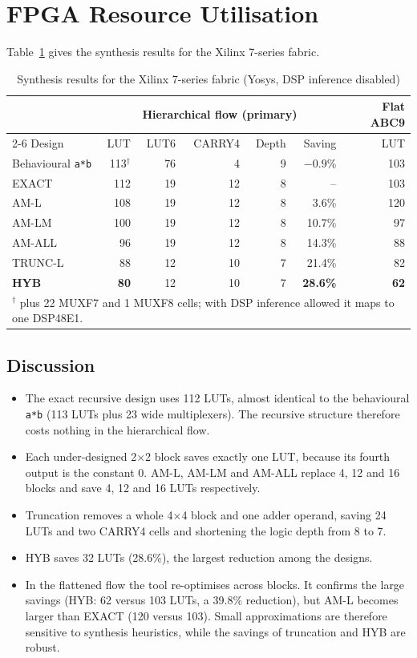 \documentclass[12pt,a4paper,oneside]{report}
\begin{document}
\section{FPGA Resource Utilisation}
Table~\ref{tab:syn} gives the synthesis results for the Xilinx 7-series fabric.

\begin{table}[ht]
\centering
\caption{Synthesis results for the Xilinx 7-series fabric (Yosys, DSP inference disabled)}
\label{tab:syn}
\begin{tabular}{lrrrrrr}
\toprule
 & \multicolumn{5}{c}{Hierarchical flow (primary)} & Flat ABC9 \\
\cmidrule(lr){2-6}
Design & LUT & LUT6 & CARRY4 & Depth & Saving & LUT \\
\midrule
Behavioural \texttt{a*b} & 113$^\dagger$ & 76 & 4 & 9 & $-0.9$\% & 103 \\
EXACT   & 112 & 19 & 12 & 8 & --     & 103 \\
AM-L    & 108 & 19 & 12 & 8 & 3.6\%  & 120 \\
AM-LM   & 100 & 19 & 12 & 8 & 10.7\% & 97 \\
AM-ALL  & 96  & 19 & 12 & 8 & 14.3\% & 88 \\
TRUNC-L & 88  & 12 & 10 & 7 & 21.4\% & 82 \\
\textbf{HYB} & \textbf{80} & 12 & 10 & 7 & \textbf{28.6\%} & \textbf{62} \\
\bottomrule
\multicolumn{7}{l}{\footnotesize $^\dagger$ plus 22 MUXF7 and 1 MUXF8 cells; with DSP inference allowed it maps to one DSP48E1.}
\end{tabular}
\end{table}

\subsection{Discussion}
\begin{itemize}
\item The exact recursive design uses 112 LUTs, almost identical to the behavioural \texttt{a*b} (113 LUTs plus 23 wide multiplexers). The recursive structure therefore costs nothing in the hierarchical flow.
\item Each under-designed 2$\times$2 block saves exactly one LUT, because its fourth output is the constant 0. AM-L, AM-LM and AM-ALL replace 4, 12 and 16 blocks and save 4, 12 and 16 LUTs respectively.
\item Truncation removes a whole 4$\times$4 block and one adder operand, saving 24 LUTs and two CARRY4 cells and shortening the logic depth from 8 to 7.
\item HYB saves 32 LUTs (28.6\%), the largest reduction among the designs.
\item In the flattened flow the tool re-optimises across blocks. It confirms the large savings (HYB: 62 versus 103 LUTs, a 39.8\% reduction), but AM-L becomes larger than EXACT (120 versus 103). Small approximations are therefore sensitive to synthesis heuristics, while the savings of truncation and HYB are robust.
\end{itemize}
\end{document}
